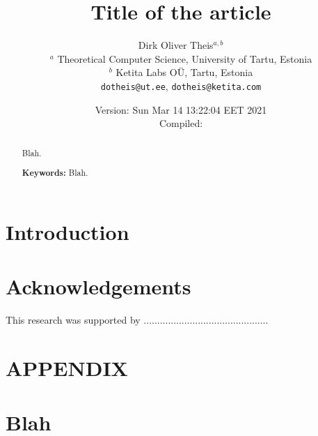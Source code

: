 \documentclass[a4paper,10pt,twoside,reqno,nonamelimits]{article}
\begin{document}
\title{Title of the article}
\author{Dirk Oliver Theis$^{a,b}$
\\[1ex]
  \small $^a$ Theoretical Computer Science, University of Tartu, Estonia\\
  \small $^b$ Ketita Labs {\tiny O\"U}, Tartu, Estonia\\
  \small \texttt{dotheis@ut.ee}, \texttt{dotheis@ketita.com}%
}
\date{Version: Sun Mar 14 13:22:04 EET 2021
  \\
  Compiled: \currenttime}
\maketitle

%
%
%
%
%
\begin{abstract}
  Blah.
  \par\medskip%
  \textbf{Keywords:} Blah.
\end{abstract}

\section{Introduction}\label{sec:intro}

\section*{Acknowledgements}
This research was supported by ..............................................




\appendix
\section*{APPENDIX}
\section{Blah}
\end{document}
